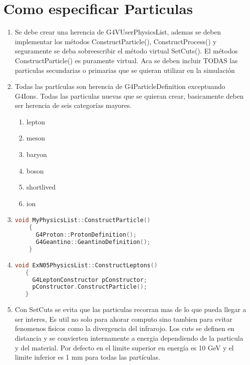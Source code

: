 \documentclass[10pt,a4paper,oneside]{book}
\begin{document}
\section*{Como especificar Particulas}
\begin{enumerate}
\item Se debe crear una herencia de G4VUserPhysicsList, ademas se
  deben implementar los métodos ConstructParticle(),
  ConstructProcess() y seguramente se deba sobreescribir el método
  virtual SetCuts(). El métodos ConstructParticle() es puramente
  virtual. Aca se deben incluir TODAS las particulas secundarias o
  primarias que se quieran utilizar en la simulación
\item Todas las partículas son herencia de G4ParticleDefinition
  exceptuando G4Ions. Todas las particulas nuevas que se quieran
  crear, basicamente deben ser herencia de seis categorías mayores.
  \begin{enumerate}
  \item lepton
  \item meson
  \item baryon
  \item boson
  \item shortlived
  \item ion
  \end{enumerate}

\item
  \begin{lstlisting}[language=C++, frame = single]
    void MyPhysicsList::ConstructParticle()
    {
      G4Proton::ProtonDefinition();
      G4Geantino::GeantinoDefinition();
    }
  \end{lstlisting}

  
\item
  \begin{lstlisting}[language=C++, frame = single]
   void ExN05PhysicsList::ConstructLeptons()
   {
     G4LeptonConstructor pConstructor;
     pConstructor.ConstructParticle();
   }
 \end{lstlisting}

\item Con SetCuts se evita que las particulas recorran mas de lo que
  pueda llegar a ser interes, Es util no solo para ahorar computo sino
  tambien para evitar fenomenos fisicos como la divergencia del
  infrarojo. Los cuts se definen en distancia y se convierten
  internamente a energia dependiendo de la particula y del material.
  Por defecto en el limite superior en energía es 10 GeV y el limite
  inferior es 1 mm para todas las partículas.
\end{enumerate}
\end{document}
